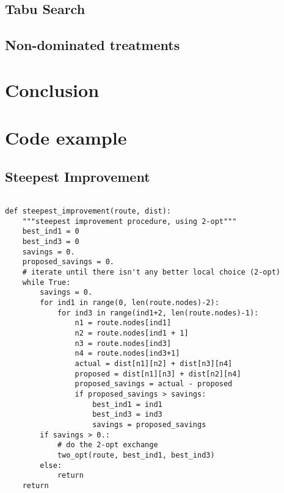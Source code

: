 \documentclass{article} %
\begin{document}
\subsection{Tabu Search}



\subsection{Non-dominated treatments}



\section{Conclusion}







\section{Code example}


\subsection{Steepest Improvement}
\label{code_steepest_improvement}
\begin{verbatim}

def steepest_improvement(route, dist):
    """steepest improvement procedure, using 2-opt"""
    best_ind1 = 0
    best_ind3 = 0
    savings = 0.
    proposed_savings = 0.
    # iterate until there isn't any better local choice (2-opt)
    while True:
        savings = 0.
        for ind1 in range(0, len(route.nodes)-2):
            for ind3 in range(ind1+2, len(route.nodes)-1):
                n1 = route.nodes[ind1]
                n2 = route.nodes[ind1 + 1]
                n3 = route.nodes[ind3]
                n4 = route.nodes[ind3+1]
                actual = dist[n1][n2] + dist[n3][n4]
                proposed = dist[n1][n3] + dist[n2][n4]
                proposed_savings = actual - proposed
                if proposed_savings > savings:
                    best_ind1 = ind1
                    best_ind3 = ind3
                    savings = proposed_savings
        if savings > 0.:
        	# do the 2-opt exchange
            two_opt(route, best_ind1, best_ind3)
        else:
            return
    return
\end{verbatim}
\end{document}
